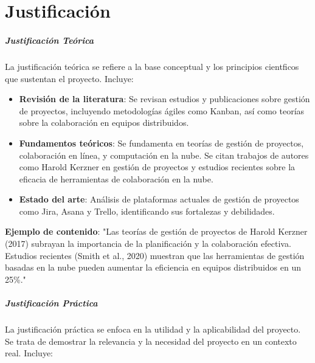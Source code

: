\chapter{Justificación}
\label{Justificación}


\paragraph{Justificación Teórica}
La justificación teórica se refiere a la base conceptual y los principios cientficos que sustentan el proyecto. Incluye: 

\begin{itemize}
    \item \textbf{Revisión de la literatura}: Se revisan estudios y publicaciones sobre gestión de proyectos, incluyendo metodologías ágiles como  Kanban, así como teorías sobre la colaboración en equipos distribuidos.
    \item \textbf{Fundamentos teóricos}: Se fundamenta en teorías de gestión de proyectos, colaboración en línea, y computación en la nube. Se citan trabajos de autores como Harold Kerzner en gestión de proyectos y estudios recientes sobre la eficacia de herramientas de colaboración en la nube.
    \item \textbf{Estado del arte}: Análisis de plataformas actuales de gestión de proyectos como Jira, Asana y Trello, identificando sus fortalezas y debilidades.

\end{itemize}
\textbf{Ejemplo de contenido}: "Las teorías de gestión de proyectos de Harold Kerzner (2017) subrayan la importancia de la planificación y la colaboración efectiva. Estudios recientes (Smith et al., 2020) muestran que las herramientas de gestión basadas en la nube pueden aumentar la eficiencia en equipos distribuidos en un 25\%."

\paragraph{Justificación Práctica}
La justificación práctica se enfoca en la utilidad y la aplicabilidad del proyecto. Se trata de demostrar la relevancia y la necesidad del proyecto en un contexto real. Incluye: 

